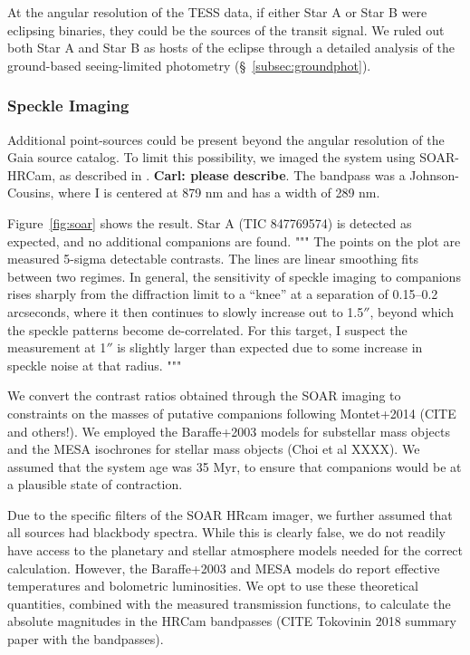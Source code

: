 \documentclass[12pt,twocolumn,tighten]{aastex62}
\begin{document}
At the angular resolution of the TESS data, if either Star A or Star B
were eclipsing binaries, they could be the sources of the transit
signal.  We ruled out both Star A and Star B as hosts of the eclipse
through a detailed analysis of the ground-based seeing-limited
photometry (\S~\ref{subsec:groundphot}).

\subsubsection{Speckle Imaging}

Additional point-sources could be present beyond the angular
resolution of the Gaia source catalog.
To limit this possibility,
we imaged the system using SOAR-HRCam, as described in
\citet{ziegler_soar_2020}.
{\bf Carl: please describe}.
The bandpass was a Johnson-Cousins,
where I is centered at 879 nm and has a width of 289 nm.

Figure~\ref{fig:soar} shows the result.
Star A (TIC 847769574) is detected as expected, and no additional
companions are found.
"""
The points on the plot are measured 5-sigma detectable contrasts. The
lines are linear smoothing fits between two regimes. In general, the
sensitivity of speckle imaging to companions rises sharply from the
diffraction limit to a ``knee'' at a separation of 0.15--0.2
arcseconds, where it then continues to slowly increase out to 1.5$''$,
beyond which the speckle patterns become de-correlated. For this
target, I suspect the measurement at 1$''$ is slightly larger than
expected due to some increase in speckle noise at that radius.
"""

We convert the contrast ratios obtained through the SOAR imaging to
constraints on the masses of putative companions following Montet+2014
(CITE and others!).  We employed the Baraffe+2003 models for
substellar mass objects and the MESA isochrones for stellar mass
objects (Choi et al XXXX).  We assumed that the system age was 35 Myr,
to ensure that companions would be at a plausible state of
contraction.

Due to the specific filters of the SOAR HRcam imager, we further
assumed that all sources had blackbody spectra. While this is clearly
false, we do not readily have access to the planetary and stellar
atmosphere models needed for the correct calculation. However, the
Baraffe+2003 and MESA models do report effective temperatures and
bolometric luminosities.  We opt to use these theoretical quantities,
combined with the measured transmission functions, to calculate the
absolute magnitudes in the HRCam bandpasses (CITE Tokovinin 2018
summary paper with the bandpasses).  
\end{document}
